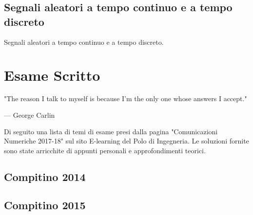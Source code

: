 \documentclass[12pt,oneside,openany]{memoir}
\numberwithin{equation}{subsection}
\begin{document}

\newpage
\section{Segnali aleatori a tempo continuo e a tempo discreto}
Segnali aleatori a tempo continuo e a tempo discreto.


\chapter{Esame Scritto}
\epigraph{
	"The reason I talk to myself is because I'm the only one whose answers I
	accept."
}{--- \textup{George Carlin}}

Di seguito una lista di temi di esame presi dalla pagina "Comunicazioni
Numeriche 2017-18" sul sito E-learning del Polo di Ingegneria. Le soluzioni
fornite sono state arricchite di appunti personali e approfondimenti teorici.


\section{Compitino 2014}


\section{Compitino 2015}

\end{document}
